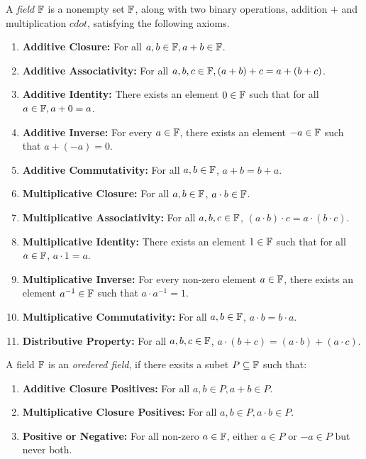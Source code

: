\begin{definition}
  A \emph{field} $\mathbb{F}$ is a nonempty set $\mathbb{F}$, along with two binary operations, addition $+$ and multiplication $cdot$, satisfying the following axioms.
  \begin{enumerate}
    \item \textbf{Additive Closure:} For all $a, b \in \mathbb{F}, a + b \in \mathbb{F}$.
    \item \textbf{Additive Associativity:} For all $a, b, c \in \mathbb{F}, (a + b) + c = a + (b + c)$.
    \item \textbf{Additive Identity:} There exists an element $0 \in \mathbb{F}$ such that for all $a \in \mathbb{F}, a + 0 = a$.
    \item \textbf{Additive Inverse:} For every $a \in \mathbb{F}$, there exists an element $-a \in \mathbb{F}$ such that $a + (-a) = 0$.
    \item \textbf{Additive Commutativity:} For all $a, b \in \mathbb{F}$, $a + b = b + a$.
    \item \textbf{Multiplicative Closure:} For all $a, b \in \mathbb{F}$, $a \cdot b \in \mathbb{F}$.
    \item \textbf{Multiplicative Associativity:} For all $a, b, c \in \mathbb{F}$, $(a \cdot b) \cdot c = a \cdot (b \cdot c)$.
    \item \textbf{Multiplicative Identity:} There exists an element $1 \in \mathbb{F}$ such that for all $a \in \mathbb{F}$, $a \cdot 1 = a$.
    \item \textbf{Multiplicative Inverse:} For every non-zero element $a \in \mathbb{F}$, there exists an element $a^{-1} \in \mathbb{F}$ such that $a \cdot a^{-1} = 1$.
    \item \textbf{Multiplicative Commutativity:} For all $a, b \in \mathbb{F}$, $a \cdot b = b \cdot a$.
    \item \textbf{Distributive Property:} For all $a, b, c \in \mathbb{F}$, $a \cdot (b + c) = (a \cdot b) + (a \cdot c)$.
  \end{enumerate}
\end{definition}

\begin{definition}
  A field $\mathbb{F}$ is an \emph{oredered field}, if there exsits a subet $P \subseteq \mathbb{F}$ such that:
  \begin{enumerate}
    \item \textbf{Additive Closure Positives:} For all $a, b \in P, a + b \in P$.
    \item \textbf{Multiplicative Closure Positives:} For all $a, b \in P, a \cdot b \in P$.
    \item \textbf{Positive or Negative:} For all non-zero $a \in \mathbb{F}$, either $a \in P$ or $-a \in P$ but never both.
  \end{enumerate}
\end{definition}




